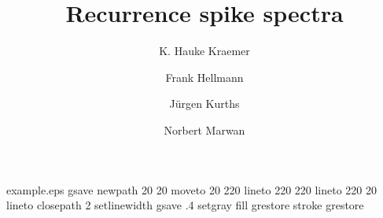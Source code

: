 %
%
%
%
%
\begin{filecontents*}{example.eps}
gsave
newpath
  20 20 moveto
  20 220 lineto
  220 220 lineto
  220 20 lineto
closepath
2 setlinewidth
gsave
  .4 setgray fill
grestore
stroke
grestore
\end{filecontents*}
%
\RequirePackage{fix-cm}
%
\documentclass[smallcondensed]{svjour3}    %

%
\smartqed  %
%
\usepackage{graphicx}
%
%
\usepackage{dcolumn}%
\usepackage{bm}%
\setlength{\marginparwidth}{2cm}
\usepackage{changes}
\usepackage{bbm}
\usepackage[utf8]{inputenc}
\usepackage[T1]{fontenc}
\usepackage{mathptmx}
\usepackage{amsmath}
\usepackage{amssymb}
\usepackage{statmath}
\usepackage[numbers]{natbib}
\usepackage{hyperref}
\usepackage{enumitem}
%
%
%


\title{Recurrence spike spectra}


\author{K. Hauke Kraemer \and
		Frank Hellmann \and
        J\"urgen Kurths \and 
        Norbert Marwan
}



